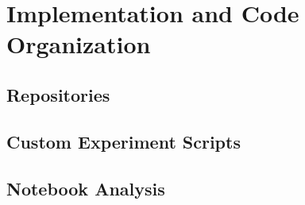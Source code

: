 \chapter{Implementation and Code Organization}
\label{ch:implementation_code_organization}

\section{Repositories}
\label{sec:repositories}

\section{Custom Experiment Scripts}
\label{sec:custom_experiment_scripts}

\section{Notebook Analysis}
\label{sec:notebook_analysis}
